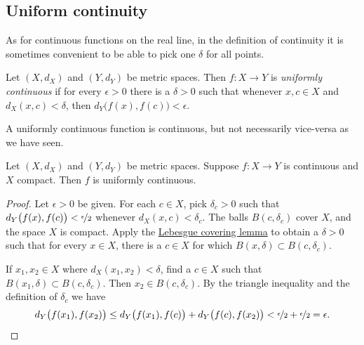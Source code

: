 \subsection{Uniform continuity}

As for continuous
functions on the real line, in the definition of continuity
it is sometimes convenient to be able to pick
one $\delta$ for all points.

\begin{defn}
Let $(X,d_X)$ and $(Y,d_Y)$ be metric spaces.
Then $f \colon X \to Y$ is
\emph{uniformly continuous}
if for every $\epsilon > 0$
there is a $\delta > 0$ such that whenever $x,c \in X$ and $d_X(x,c) <
\delta$, then
$d_Y\bigl(f(x),f(c)\bigr) < \epsilon$.
\end{defn}

A uniformly continuous function is continuous, but not necessarily
vice-versa as we have seen.

\begin{thm} \label{thm:Xcompactfunifcont}
Let $(X,d_X)$ and $(Y,d_Y)$ be metric spaces.
Suppose $f \colon X \to Y$ is continuous and $X$ compact.  Then
$f$ is uniformly continuous.
\end{thm}

\begin{proof}
Let $\epsilon > 0$ be given.  For each $c \in X$, pick $\delta_c > 0$ such that
$d_Y\bigl(f(x),f(c)\bigr) < \nicefrac{\epsilon}{2}$
whenever
$d_X(x,c) < \delta_c$.
The balls
$B(c,\delta_c)$ cover $X$, and the space $X$ is compact.  
Apply the \hyperref[ms:lebesgue]{Lebesgue covering lemma} to obtain a 
$\delta > 0$ such that for every $x \in X$, there is a $c \in X$
for which $B(x,\delta) \subset B(c,\delta_c)$.

If $x_1, x_2 \in X$ where $d_X(x_1,x_2) < \delta$,
find a $c \in X$ such that $B(x_1,\delta) \subset B(c,\delta_c)$.
Then $x_2 \in B(c,\delta_c)$.  By the triangle inequality
and the definition of $\delta_c$ we have
\begin{equation*}
d_Y\bigl(f(x_1),f(x_2)\bigr)
\leq
d_Y\bigl(f(x_1),f(c)\bigr)
+
d_Y\bigl(f(c),f(x_2)\bigr)
<
\nicefrac{\epsilon}{2}+
\nicefrac{\epsilon}{2} = \epsilon .  \qedhere
\end{equation*}
\end{proof}

